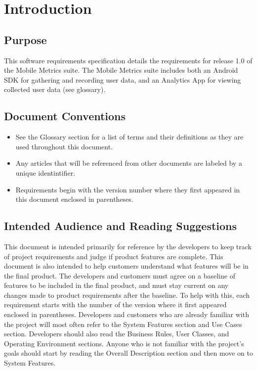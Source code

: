 \documentclass[12pt,oneside,letterpaper]{article}
\begin{document}
\newpage


\section{Introduction}
\subsection{Purpose}
This software requirements specification details the requirements for release 1.0 of the Mobile Metrics suite. The Mobile Metrics suite includes both an Android SDK for gathering and recording user data, and an Analytics App for viewing collected user data (see glossary). 
\subsection{Document Conventions}
\begin{itemize}
\item See the Glossary section for a list of terms and their definitions as they are used throughout this document.
\item Any articles that will be referenced from other documents are labeled by a unique identintifier.
\item Requirements begin with the version number where they first appeared in this document enclosed in parentheses.
\end{itemize}

\subsection{Intended Audience and Reading Suggestions}
This document is intended primarily for reference by the developers to keep track of project requirements and judge if product features are complete. This document is also intended to help customers understand what features will be in the final product. The developers and customers must agree on a baseline of features to be included in the final product, and must stay current on any changes made to product requirements after the baseline. To help with this, each requirement starts with the number of the version where it first appeared enclosed in parentheses. Developers and customers who are already familiar with the project will most often refer to the System Features section and Use Cases section. Developers should also read the Business Rules, User Classes, and Operating Environment sections. Anyone who is not familiar with the project's goals should start by reading the Overall Description section and then move on to System Features.
\end{document}
